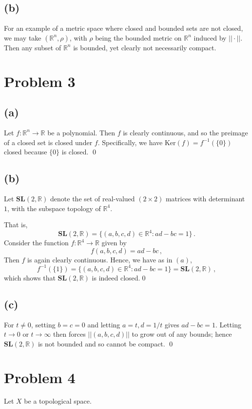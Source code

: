 \documentclass[11pt]{amsart}
\theoremstyle{definition}
\newcommand{\R}{\mathbb{R}}
\numberwithin{equation}{section}
\begin{document}
\subsection*{(b)}
For an example of a metric space where closed and bounded sets are not closed, we may take $(\R^n, \rho)$, with $\rho$ being the bounded metric on $\R^n$ induced by $||\cdot||$. Then any subset of $\R^n$ is bounded, yet clearly not necessarily compact.

\section{Problem 3}
\subsection*{(a)}
Let $f: \R^n \to \R$ be a polynomial. Then $f$ is clearly continuous, and so the preimage of a closed set is closed under $f$. Specifically, we have
$
\mbox{Ker}(f) = f^{-1}(\{0\})
$
closed because $\{0\}$ is closed. \qed

\subsection*{(b)}
\newcommand{\SLtwo}{\mathbf{SL}(2,\R)}
Let $\SLtwo$ denote the set of real-valued $(2\times2)$ matrices with determinant $1$, with the subspace topology of $\R^4$.

That is, 
\begin{equation}
\SLtwo = \{(a,b,c,d) \in \R^4: ad - bc = 1\}\,.
\end{equation}
Consider the function $f: \R^4 \to \R$ given by
\begin{equation}
f(a,b,c,d) = ad - bc\,,
\end{equation}
Then $f$ is again clearly continuous. Hence, we have as in $(a)$,
\begin{equation}
f^{-1}(\{1\})
=
\{(a,b,c,d) \in \R^4: ad - bc = 1\}
= \SLtwo\,,
\end{equation}
which shows that $\SLtwo$ is indeed closed.\qed
\subsection*{(c)}
For $t \neq 0$, setting $b = c = 0$ and letting $a = t, d = 1/t$ gives $ad - bc = 1$. Letting $t \to 0$ or $t \to \infty$ then forces $||(a,b,c,d)||$ to grow out of any bounds; hence $\SLtwo$ is not bounded and so cannot be compact. \qed

\section{Problem 4}
Let $X$ be a topological space. 
\end{document}

